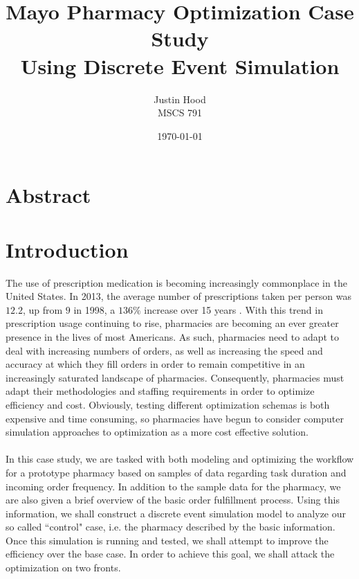 \documentclass[10pt]{report}            %
\title{\bf Mayo Pharmacy Optimization Case Study\\
\large Using Discrete Event Simulation}  %
\author{Justin Hood\\
MSCS 791}              %
\date{\today}                           %
\begin{document}
\maketitle                              %
\setcounter{page}{2}                    %
\newpage
\section*{Abstract}
\section*{Introduction}                %
The use of prescription medication is becoming increasingly commonplace in the United States. In 2013, the average number of prescriptions taken per person was $12.2$, up from $9$ in 1998, a $136\%$ increase over 15 years \cite{georgetown}\cite{statistica}. With this trend in prescription usage continuing to rise, pharmacies are becoming an ever greater presence in the lives of most Americans. As such, pharmacies need to adapt to deal with increasing numbers of orders, as well as increasing the speed and accuracy at which they fill orders in order to remain competitive in an increasingly saturated landscape of pharmacies.  Consequently, pharmacies must adapt their methodologies and staffing requirements in order to optimize efficiency and cost. Obviously, testing different optimization schemas is both expensive and time consuming, so pharmacies have begun to consider computer simulation approaches to optimization as a more cost effective solution.\\\hfill\\
In this case study, we are tasked with both modeling and optimizing the workflow for a prototype pharmacy based on samples of data regarding task duration and incoming order frequency. In addition to the sample data for the pharmacy, we are also given a brief overview of the basic order fulfillment process. Using this information, we shall construct a discrete event simulation model to analyze our so called ``control" case, i.e. the pharmacy described by the basic information. Once this simulation is running and tested, we shall attempt to improve the efficiency over the base case. In order to achieve this goal, we shall attack the optimization on two fronts.
\end{document}
